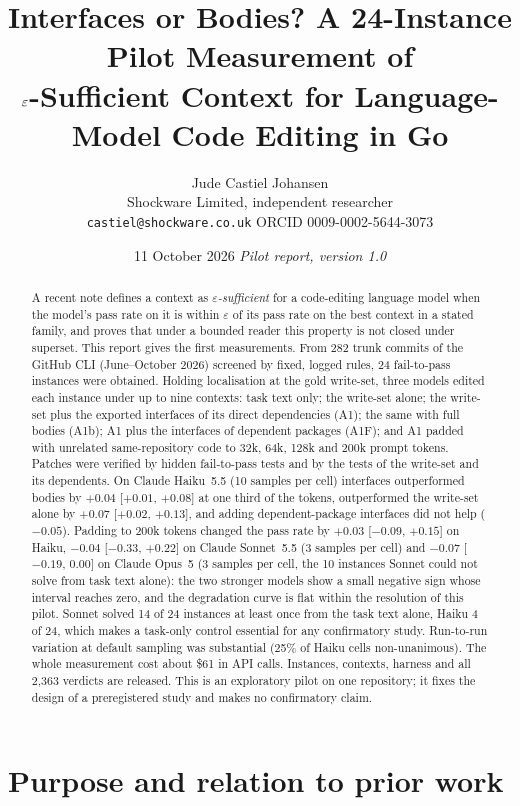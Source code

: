 \documentclass[10pt]{article}
\title{Interfaces or Bodies? A 24-Instance Pilot Measurement of\\ $\eps$-Sufficient Context for Language-Model Code Editing in Go}
\author{Jude Castiel Johansen\\ Shockware Limited, independent researcher\\ \texttt{castiel@shockware.co.uk} \quad ORCID 0009-0002-5644-3073}
\date{11 October 2026 \quad\textit{Pilot report, version 1.0}}
\newcommand{\eps}{\varepsilon}
\begin{document}
\maketitle

\begin{abstract}
A recent note defines a context as \emph{$\eps$-sufficient} for a code-editing language model when the model's pass rate on it is within $\eps$ of its pass rate on the best context in a stated family, and proves that under a bounded reader this property is not closed under superset. This report gives the first measurements. From 282 trunk commits of the GitHub CLI (June--October 2026) screened by fixed, logged rules, 24 fail-to-pass instances were obtained. Holding localisation at the gold write-set, three models edited each instance under up to nine contexts: task text only; the write-set alone; the write-set plus the exported interfaces of its direct dependencies (A1); the same with full bodies (A1b); A1 plus the interfaces of dependent packages (A1F); and A1 padded with unrelated same-repository code to 32k, 64k, 128k and 200k prompt tokens. Patches were verified by hidden fail-to-pass tests and by the tests of the write-set and its dependents. On Claude Haiku~5.5 (10 samples per cell) interfaces outperformed bodies by $+0.04$ [$+0.01$, $+0.08$] at one third of the tokens, outperformed the write-set alone by $+0.07$ [$+0.02$, $+0.13$], and adding dependent-package interfaces did not help ($-0.05$). Padding to 200k tokens changed the pass rate by $+0.03$ [$-0.09$, $+0.15$] on Haiku, $-0.04$ [$-0.33$, $+0.22$] on Claude Sonnet~5.5 (3 samples per cell) and $-0.07$ [$-0.19$, $0.00$] on Claude Opus~5 (3 samples per cell, the 10 instances Sonnet could not solve from task text alone): the two stronger models show a small negative sign whose interval reaches zero, and the degradation curve is flat within the resolution of this pilot. Sonnet solved 14 of 24 instances at least once from the task text alone, Haiku 4 of 24, which makes a task-only control essential for any confirmatory study. Run-to-run variation at default sampling was substantial (25\% of Haiku cells non-unanimous). The whole measurement cost about \$61 in API calls. Instances, contexts, harness and all 2,363 verdicts are released. This is an exploratory pilot on one repository; it fixes the design of a preregistered study and makes no confirmatory claim.
\end{abstract}

\section{Purpose and relation to prior work}
\end{document}
